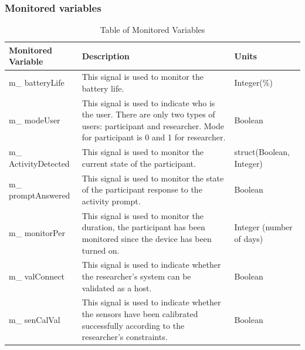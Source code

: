 \documentclass[12pt]{article}
\begin{document}
\subsubsection{Monitored variables}
\begin{table}[H]
\begin{tabular}{ |p{9em}|p{25em}|p{6em}| }
  \hline
  \rowcolor{LightCyan}
  \textbf{Monitored Variable}       	& \textbf{Description}                                                                                                                                                                         			 	& \textbf{Units}\\
  \hline
  \label{mBat}m\_ batteryLife      	& This signal is used to monitor the battery life.                                                                                                                                    				& Integer(\%)\\
  \hline

   \label{mMod}m\_ modeUser        	& This signal is used to indicate who is the user. There are only two types of users: participant and researcher. Mode for participant is 0 and 1 for researcher.   	& Boolean \\
  \hline
  \label{mAct}m\_ ActivityDetected  	& This signal is used to monitor the current state of the participant.                                                                                            						& struct(Boolean, Integer)\\
  \hline
  \label{mPro}m\_ promptAnswered   	& This signal is used to monitor the state of the participant response to the activity prompt.                                                                                  			& Boolean\\
  \hline
 \label{mMon} m\_ monitorPer       	& This signal is used to monitor the duration, the participant has been monitored since the device has been turned on.                                        			&Integer (number of days)\\
  \hline
 \label{mVal}m\_ valConnect       	& This signal is used to indicate whether the researcher's system can be validated as a host.                 											& Boolean\\
  \hline

 \label{mSen} m\_ senCalVal        	& This signal is used to indicate whether the sensors have been calibrated successfully according to the researcher's constraints.                                                & Boolean\\
  \hline
\end{tabular}
\\
\linebreak
\linebreak
\caption{\label{monVar}Table of Monitored Variables}  
\end{table}
\end{document}
